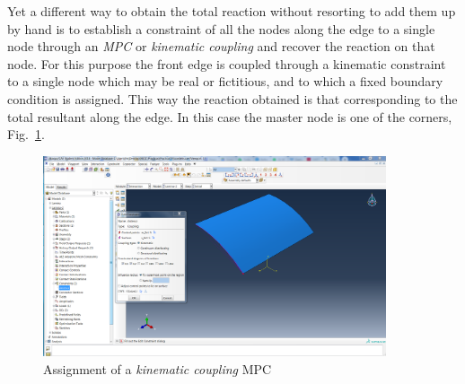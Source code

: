 \documentclass[english,a4paper,12pt]{article}
\begin{document}
Yet a different way to obtain the total reaction without resorting to add them up by hand is to establish a constraint of all the nodes along the edge to a single node through an \emph{MPC} or \emph{kinematic coupling} and recover the reaction on that node.
For this purpose the front edge is coupled through a kinematic constraint to a single node which may be real or fictitious, and to which a fixed boundary condition is assigned.
This way the reaction obtained is that corresponding to the total resultant along the edge.
In this case the master node is one of the corners, Fig.~\ref{fig:asig-kine-coup}.
\begin{figure}[!htp]
\centering
\includegraphics[width=0.9\textwidth]{fm/Fig-7_Kinematic_constraint.png}
\caption{Assignment of a \emph{kinematic coupling} MPC}
\label{fig:asig-kine-coup}
\end{figure}
\end{document}
